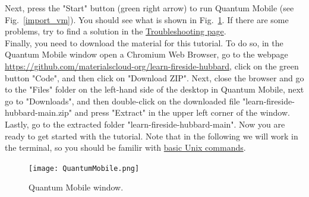 \documentclass[12pt]{article}
\begin{document}
\vskip 0.5cm

\noindent
Next, press the "Start" button (green right arrow) to run Quantum Mobile (see Fig.~\ref{import_vm}). You should see what is shown in Fig.~\ref{QM}. If there are some problems, try to find a solution in the \href{https://quantum-mobile.readthedocs.io/en/latest/users/troubleshoot.html}{Troubleshooting page}.\\

\noindent
Finally, you need to download the material for this tutorial. To do so, in the Quantum Mobile window open a Chromium Web Browser, go to the webpage 
\href{https://github.com/materialscloud-org/learn-fireside-hubbard}
{https://github.com/materialscloud-org/learn-fireside-hubbard},
click on the green button "Code", and then click on "Download ZIP".
Next, close the browser and go to the "Files" folder on the left-hand side of the desktop in Quantum Mobile, next go to "Downloads", and then double-click on the downloaded file "learn-fireside-hubbard-main.zip" and press "Extract" in the upper left corner of the window. Lastly, go to the extracted folder "learn-fireside-hubbard-main". Now you are ready to get started with the tutorial. Note that in the following we will work in the terminal, so you should be familir with \href{http://mally.stanford.edu/~sr/computing/basic-unix.html}{basic Unix commands}.

\begin{figure}[h!]
\centering
\texttt{[image: QuantumMobile.png]}
\caption{Quantum Mobile window.}
\label{QM}
\end{figure}
\end{document}
